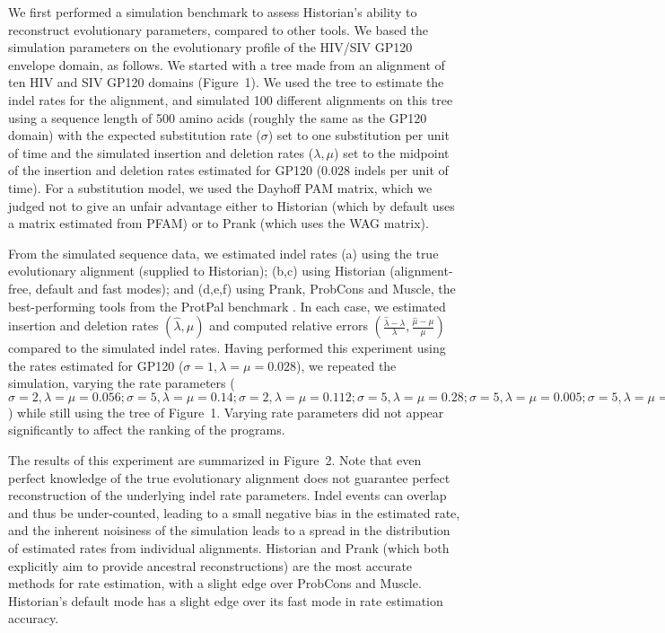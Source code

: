 We first performed a simulation benchmark to assess Historian's ability to reconstruct evolutionary parameters,
compared to other tools.
We based the simulation parameters on the evolutionary profile of the HIV/SIV GP120 envelope domain, as follows.
We started with a tree made from an alignment of ten HIV and SIV GP120 domains (Figure~1).
We used the tree to estimate the indel rates for the alignment,
and simulated 100 different alignments on this tree
using a sequence length of 500 amino acids
(roughly the same as the GP120 domain)
with the expected substitution rate ($\sigma$) set to one substitution per unit of time
and the simulated insertion and deletion rates ($\lambda,\mu$)
set to the midpoint of the insertion and deletion rates
estimated for GP120 (0.028 indels per unit of time).
For a substitution model, we used the Dayhoff PAM matrix,
which we judged not to give an unfair advantage either to Historian
(which by default uses a matrix estimated from PFAM)
or to Prank (which uses the WAG matrix).

From the simulated sequence data, we estimated indel rates
(a) using the true evolutionary alignment (supplied to Historian);
(b,c) using Historian (alignment-free, default and fast modes);
and
(d,e,f) using Prank, ProbCons and Muscle,
the best-performing tools from the ProtPal benchmark \citep{Westesson2012-zg}.
In each case, we estimated insertion and deletion rates $(\hat{\lambda},\hat{\mu})$ and computed relative errors $(\frac{\hat{\lambda}-\lambda}{\lambda},\frac{\hat{\mu}-\mu}{\mu})$
compared to the simulated indel rates.
Having performed this experiment
using the rates estimated for GP120 ($\sigma=1,\lambda=\mu=0.028$),
we repeated the simulation, varying the rate parameters
($\sigma=2,\lambda=\mu=0.056;
\sigma=5,\lambda=\mu=0.14;
\sigma=2,\lambda=\mu=0.112;
\sigma=5,\lambda=\mu=0.28;
\sigma=5,\lambda=\mu=0.005;
\sigma=5,\lambda=\mu=0.01$)
while still using the tree of Figure~1.
Varying rate parameters did not appear
significantly to affect the ranking of the programs.

The results of this experiment are summarized in Figure~2.
Note that even perfect knowledge of the true evolutionary alignment does not guarantee perfect reconstruction of the underlying indel rate parameters.
Indel events can overlap and thus be under-counted,
leading to a small negative bias in the estimated rate,
and the inherent noisiness of the simulation leads to a spread in the distribution
of estimated rates from individual alignments.
Historian and Prank (which both explicitly aim to provide ancestral reconstructions)
are the most accurate methods for rate estimation,
with a slight edge over ProbCons and Muscle.
Historian's default mode has a slight edge over its fast mode in rate estimation accuracy.

